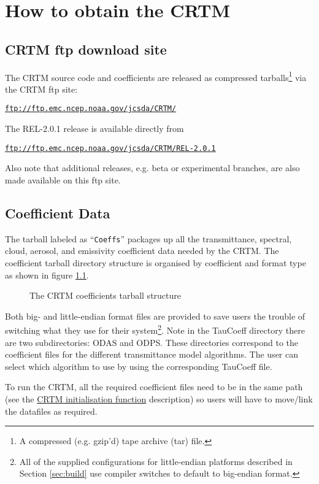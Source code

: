 \chapter{How to obtain the CRTM}

\section{CRTM ftp download site}
The CRTM source code and coefficients are released as compressed tarballs\footnote{A compressed (e.g. gzip'd) tape archive (tar) file.} via the CRTM ftp site:

\hspace{1cm}\href{ftp://ftp.emc.ncep.noaa.gov/jcsda/CRTM}{\texttt{ftp://ftp.emc.ncep.noaa.gov/jcsda/CRTM/}}

The REL-2.0.1 release is available directly from

\hspace{1cm}\href{ftp://ftp.emc.ncep.noaa.gov/jcsda/CRTM/REL-2.0.1}{\texttt{ftp://ftp.emc.ncep.noaa.gov/jcsda/CRTM/REL-2.0.1}}

Also note that additional releases, e.g. beta or experimental branches, are also made available on this ftp site.


\section{Coefficient Data}
The tarball labeled as ``\texttt{Coeffs}'' packages up all the transmittance, spectral, cloud, aerosol, and emissivity coefficient data needed by the CRTM. The coefficient tarball directory structure is organised by coefficient and format type as shown in figure \ref{fig:crtm_coefficients_dir}.

\begin{figure}[htb]
  \centering
  
  \caption{The CRTM coefficients tarball structure}
  \label{fig:crtm_coefficients_dir}
\end{figure}

Both big- and little-endian format files are provided to save users the trouble of switching what they use for their system\footnote{All of the supplied configurations for little-endian platforms described in Section \ref{sec:build} use compiler switches to default to big-endian format.}. Note in the TauCoeff directory there are two subdirectories: ODAS and ODPS. These directories correspond to the coefficient files for the different transmittance model algorithms. The user can select which algorithm to use by using the corresponding TauCoeff file.

To run the CRTM, all the required coefficient files need to be in the same path (see the  \hyperref[sec:CRTM_Init_interface]{CRTM initialisation function} description) so users will have to move/link the datafiles as required.
